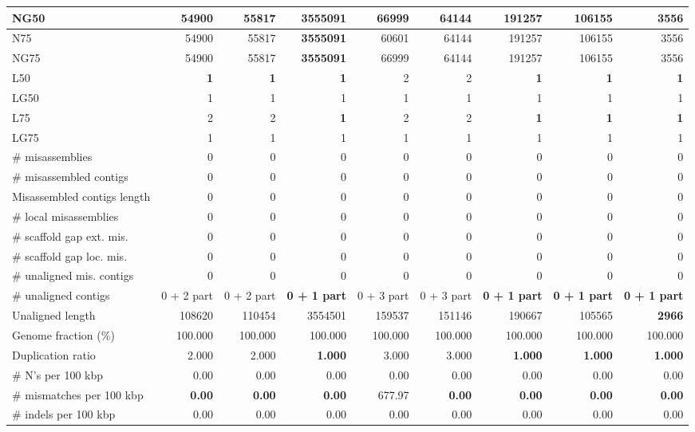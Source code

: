 \documentclass[12pt,a4paper]{article}
\begin{document}
\begin{table}[ht]
\begin{center}
\begin{tabular}{|l*{8}{|r}|}
NG50 & 54900 & 55817 & {\bf 3555091} & 66999 & 64144 & 191257 & 106155 & 3556 \\ \hline
N75 & 54900 & 55817 & {\bf 3555091} & 60601 & 64144 & 191257 & 106155 & 3556 \\ \hline
NG75 & 54900 & 55817 & {\bf 3555091} & 66999 & 64144 & 191257 & 106155 & 3556 \\ \hline
L50 & {\bf 1} & {\bf 1} & {\bf 1} & 2 & 2 & {\bf 1} & {\bf 1} & {\bf 1} \\ \hline
LG50 & 1 & 1 & 1 & 1 & 1 & 1 & 1 & 1 \\ \hline
L75 & 2 & 2 & {\bf 1} & 2 & 2 & {\bf 1} & {\bf 1} & {\bf 1} \\ \hline
LG75 & 1 & 1 & 1 & 1 & 1 & 1 & 1 & 1 \\ \hline
\# misassemblies & 0 & 0 & 0 & 0 & 0 & 0 & 0 & 0 \\ \hline
\# misassembled contigs & 0 & 0 & 0 & 0 & 0 & 0 & 0 & 0 \\ \hline
Misassembled contigs length & 0 & 0 & 0 & 0 & 0 & 0 & 0 & 0 \\ \hline
\# local misassemblies & 0 & 0 & 0 & 0 & 0 & 0 & 0 & 0 \\ \hline
\# scaffold gap ext. mis. & 0 & 0 & 0 & 0 & 0 & 0 & 0 & 0 \\ \hline
\# scaffold gap loc. mis. & 0 & 0 & 0 & 0 & 0 & 0 & 0 & 0 \\ \hline
\# unaligned mis. contigs & 0 & 0 & 0 & 0 & 0 & 0 & 0 & 0 \\ \hline
\# unaligned contigs & 0 + 2 part & 0 + 2 part & {\bf 0 + 1 part} & 0 + 3 part & 0 + 3 part & {\bf 0 + 1 part} & {\bf 0 + 1 part} & {\bf 0 + 1 part} \\ \hline
Unaligned length & 108620 & 110454 & 3554501 & 159537 & 151146 & 190667 & 105565 & {\bf 2966} \\ \hline
Genome fraction (\%) & 100.000 & 100.000 & 100.000 & 100.000 & 100.000 & 100.000 & 100.000 & 100.000 \\ \hline
Duplication ratio & 2.000 & 2.000 & {\bf 1.000} & 3.000 & 3.000 & {\bf 1.000} & {\bf 1.000} & {\bf 1.000} \\ \hline
\# N's per 100 kbp & 0.00 & 0.00 & 0.00 & 0.00 & 0.00 & 0.00 & 0.00 & 0.00 \\ \hline
\# mismatches per 100 kbp & {\bf 0.00} & {\bf 0.00} & {\bf 0.00} & 677.97 & {\bf 0.00} & {\bf 0.00} & {\bf 0.00} & {\bf 0.00} \\ \hline
\# indels per 100 kbp & 0.00 & 0.00 & 0.00 & 0.00 & 0.00 & 0.00 & 0.00 & 0.00 \\ \hline

\end{tabular}
\end{center}
\end{table}
\end{document}
